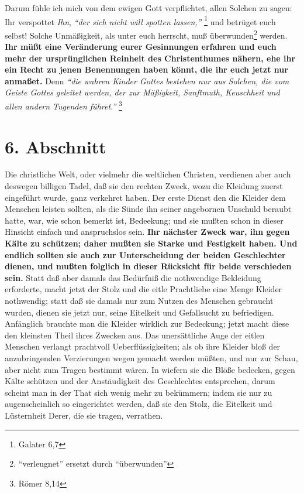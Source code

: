 \medskip

Darum fühle ich mich von dem ewigen Gott verpflichtet, allen Solchen zu sagen:
Ihr verspottet \textit{Ihn},
\textit{"`der sich nicht will spotten lassen,"'}
\footnote{Galater 6,7}
und betrüget euch selbst! Solche Unmäßigkeit, als unter euch herrscht, muß
überwunden\footnote{"`verleugnet"' ersetzt durch "`überwunden"'} werden. \textbf{Ihr müßt eine Veränderung eurer Gesinnungen erfahren und euch
mehr der ursprünglichen Reinheit des Christenthumes nähern, ehe ihr ein Recht zu
jenen Benennungen haben könnt, die ihr euch jetzt nur anmaßet.}  Denn
\textit{"`die wahren
Kinder Gottes bestehen nur aus Solchen, die vom Geiste Gottes geleitet werden,
der zur Mäßigkeit, Sanftmuth, Keuschheit und allen andern Tugenden
führet."'}
\footnote{Römer 8,14}

\section{6. Abschnitt} \label{kap14_ab6}

Die christliche Welt, oder vielmehr die weltlichen Christen, verdienen aber auch
deswegen billigen Tadel, daß sie den rechten Zweck, wozu die Kleidung zuerst
eingeführt wurde, ganz verkehret haben. Der erste Dienst den die Kleider dem
Menschen leisten sollten, als die Sünde ihn seiner angebornen Unschuld beraubt
hatte, war, wie schon bemerkt ist, Bedeekung; und sie mußten schon in dieser
Hinsicht einfach und anspruchslos sein. \textbf{Ihr nächster Zweck war, ihn gegen Kälte
zu schützen; daher mußten sie Starke und Festigkeit haben. Und endlich sollten
sie auch zur Unterscheidung der beiden Geschlechter dienen, und mußten folglich
in dieser Rücksicht für beide verschieden sein.} Statt daß aber damals das
Bedürfniß die nothwendige Bekleidung erforderte, macht jetzt der Stolz und die
eitle Prachtliebe eine Menge Kleider nothwendig; statt daß sie damals nur zum
Nutzen des Menschen gebraucht wurden, dienen sie jetzt nur, seine Eitelkeit und
Gefallsucht zu befriedigen. Anfänglich brauchte man die Kleider wirklich zur
Bedeckung; jetzt macht diese den kleinsten Theil ihres Zwecken aus. Das
unersättliche Auge der eitlen Menschen verlangt prachtvoll Ueberflüssigkeiten;
als ob ihre Kleider bloß der anzubringenden Verzierungen wegen gemacht werden
müßten, und nur zur Schau, aber nicht zum Tragen bestimmt wären. In wiefern sie
die Blöße bedecken, gegen Kälte schützen und der Anstäudigkeit des Geschlechtes
entsprechen, darum scheint man in der That sich wenig mehr zu bekümmern; indem
sie nur zu augenscheinlich so eingerichtet werden, daß sie den Stolz, die
Eitelkeit und Lüsternheit Derer, die sie tragen, verrathen.

